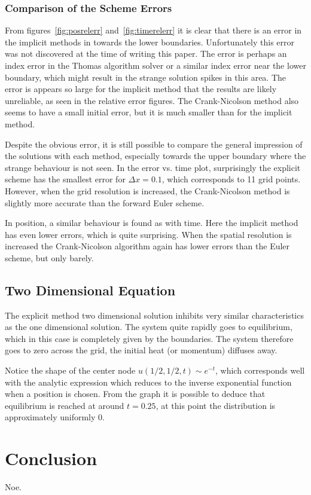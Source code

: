 \documentclass[aps,reprint]{revtex4-1}
\newcommand\blankpage{%
  \null
  \thispagestyle{empty}%
  \addtocounter{page}{-1}%
  \newpage}
\begin{document}
\subsubsection{Comparison of the Scheme Errors}
From figures~\ref{fig:posrelerr} and~\ref{fig:timerelerr} it is clear that there is
an error in the implicit methods in towards the lower boundaries. Unfortunately
this error was not discovered at the time of writing this paper. The error is
perhaps an index error in the Thomas algorithm solver or a similar index error
near the lower boundary, which might result in the strange solution spikes in this
area. The error is appears so large for the implicit method that the results
are likely unreliable, as seen in the relative error figures. The Crank-Nicolson
method also seems to have a small initial error, but it is much smaller than for
the implicit method.

Despite the obvious error, it is still possible to compare the general impression
of the solutions with each method, especially towards the upper boundary where
the strange behaviour is not seen. In the error vs. time plot, surprisingly
the explicit scheme has the smallest error for $\Delta x = 0.1$, which corresponds to
11 grid points. However, when the grid resolution is increased, the Crank-Nicolson method
is slightly more accurate than the forward Euler scheme.

In position, a similar behaviour is found as with time. Here the implicit method
has even lower errors, which is quite surprising. When the spatial resolution is increased
the Crank-Nicolson algorithm again has lower errors than the Euler scheme, but only barely.
\subsection{Two Dimensional Equation}
The explicit method two dimensional solution inhibits very similar characteristics
as the one dimensional solution. The system quite rapidly goes to equilibrium,
which in this case is completely given by the boundaries. The system therefore
goes to zero across the grid, the initial heat (or momentum) diffuses away.

Notice the shape of the center node $u(1/2, 1/2, t) \sim e^{-t}$, which corresponds
well with the analytic expression which reduces to the inverse exponential function when
a position is chosen. From the graph it is possible to deduce that equilibrium is
reached at around $t = 0.25$, at this point the distribution is approximately uniformly $0$.
\section{Conclusion} \label{sec:conclusion}
Noe.

\blankpage
\appendix
\end{document}
